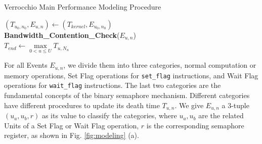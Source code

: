 \documentclass[12pt]{extbook}
\begin{document}
\begin{algorithm}[tbp]
    \caption{Verrocchio Main Performance Modeling Procedure}
    \label{alg:model}
    
    
        
    \BlankLine

    $(T_{u_{0}, n_{0}}, E_{u, n}) \leftarrow (T_{kernel}, E_{u_{0}, n_{0}})$ \\
    \textbf{Bandwidth\_Contention\_Check}($E_{u, n}$) \\
    $T_{end} \leftarrow \max\limits_{0 < u \leq U}T_{u, N_{u}}$    
\end{algorithm}

For all Events $E_{u, n}$, we divide them into three categories, normal computation or memory operations, Set Flag operations for \verb|set_flag| instructions, and Wait Flag operations for \verb|wait_flag| instructions. The last two categories are the fundamental concepts of the binary semaphore mechanism. Different categories have different procedures to update its death time $T_{u, n}$. We give $E_{u, n}$ a 3-tuple $(u_{a}, u_{b}, r)$ as its value to classify the categories, where $u_{a}, u_{b}$ are the related Units of a Set Flag or Wait Flag operation, $r$ is the corresponding semaphore register, as shown in Fig. \ref{fig:modeling} (a).
\end{document}

